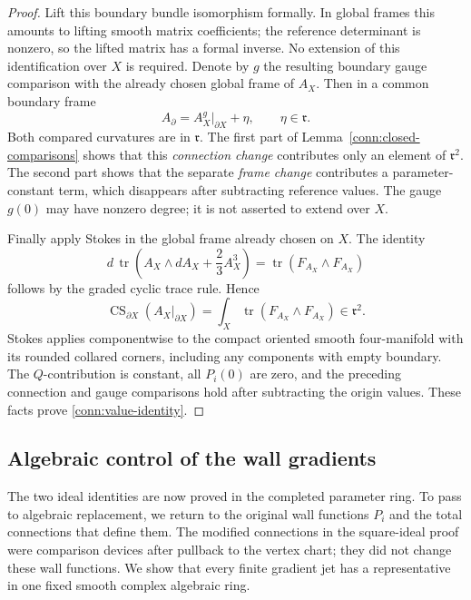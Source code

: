 \begin{proof}
Lift this boundary bundle isomorphism formally.
In global frames this amounts to lifting smooth
matrix coefficients; the reference determinant
is nonzero, so the lifted matrix has a formal
inverse.  No extension of this identification
over \(X\) is required.  Denote by \(g\) the
resulting boundary gauge comparison with the
already chosen global frame of \(A_X\).
Then in a common boundary frame
\[
 A_{\partial}=A_X^g|_{\partial X}+\eta,
                         \qquad \eta\in\mathfrak r .
\]
Both compared curvatures are in \(\mathfrak r\).
The first part of Lemma~\ref{conn:closed-comparisons}
shows that this \emph{connection change} contributes
only an element of \(\mathfrak r^2\).
The second part shows that the separate
\emph{frame change} contributes a parameter-constant
term, which disappears after subtracting reference
values.  The gauge \(g(0)\) may have nonzero degree;
it is not asserted to extend over \(X\).

Finally apply Stokes in the global frame already
chosen on \(X\).  The identity
\[
 d\,\operatorname{tr}
      \left(A_X\wedge dA_X+\frac23 A_X^3\right)
                 =\operatorname{tr}(F_{A_X}\wedge F_{A_X})
\]
follows by the graded cyclic trace rule.  Hence
\[
 \operatorname{CS}_{\partial X}(A_X|_{\partial X})
       =\int_X\operatorname{tr}(F_{A_X}\wedge F_{A_X})
                                                  \in\mathfrak r^2.
\]
Stokes applies componentwise to the compact
oriented smooth four-manifold with its rounded
collared corners, including any components with
empty boundary.  The \(Q\)-contribution is
constant, all \(P_i(0)\) are zero, and the preceding
connection and gauge comparisons hold after
subtracting the origin values.  These facts prove
\eqref{conn:value-identity}.
\end{proof}

\subsection{Algebraic control of the wall gradients}

The two ideal identities are now proved in the completed parameter
ring.  To pass to algebraic replacement, we return to the original
wall functions \(P_i\) and the total connections that define them.
The modified connections in the square-ideal proof were comparison
devices after pullback to the vertex chart; they did not change these
wall functions.  We show that every finite gradient jet has a
representative in one fixed smooth complex algebraic ring.

